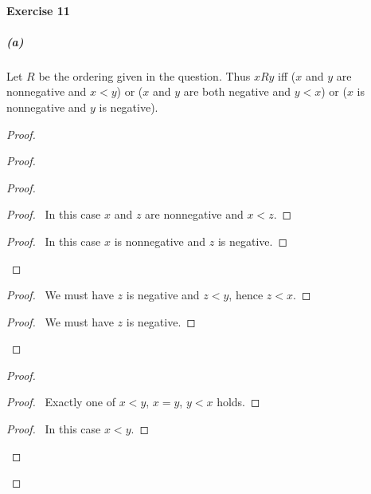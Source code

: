 \documentclass{report}
\begin{document}
     \paragraph{Exercise 11}
     \subparagraph{(a)}
     Let $R$ be the ordering given in the question. Thus $xRy$ iff ($x$ and $y$ are nonnegative and
     $x < y$) or ($x$ and $y$ are both negative and $y < x$) or ($x$ is nonnegative and $y$ is negative).
     \begin{proof}
        \pf
        \begin{proof}
            \begin{proof}
                \begin{proof}
                    \pf\ In this case $x$ and $z$ are nonnegative and $x < z$.
                \end{proof}
                \begin{proof}
                    \pf\ In this case $x$ is nonnegative and $z$ is negative.
                \end{proof}
            \end{proof}
            \begin{proof}
                \pf\ We must have $z$ is negative and $z < y$, hence $z < x$.
            \end{proof}
            \begin{proof}
                \pf\ We must have $z$ is negative.
            \end{proof}
        \end{proof}
        \begin{proof}
            \begin{proof}
                \pf\ Exactly one of $x < y$, $x = y$, $y < x$ holds.
            \end{proof}
            \begin{proof}
                \pf\ In this case $x < y$.
            \end{proof}

\end{proof}
\end{proof}
\end{document}

